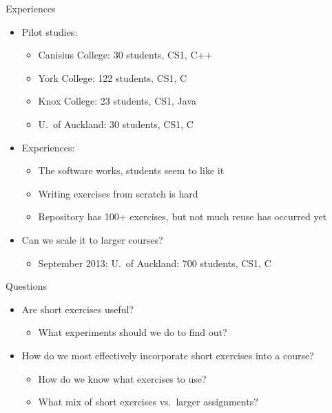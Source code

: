 \documentclass{beamer}
\begin{document}
\begin{frame}{Experiences}

\begin{itemize}
\item Pilot studies:
  \begin{itemize}
  \item Canisius College: 30 students, CS1, C++
  \item York College: 122 students, CS1, C
  \item Knox College: 23 students, CS1, Java
  \item U.\ of Auckland: 30 students, CS1, C
  \end{itemize}
\item Experiences:
  \begin{itemize}
  \item The software works, students seem to like it
  \item Writing exercises from scratch is hard
  \item Repository has 100+ exercises, but not much reuse has occurred yet
  \end{itemize}
\item Can we scale it to larger courses?
  \begin{itemize}
\item September 2013: U.\ of Auckland: 700 students, CS1, C
  \end{itemize}
\end{itemize}

\end{frame}


\begin{frame}{Questions}

\begin{itemize}
\item Are short exercises useful?
  \begin{itemize}
  \item What experiments should we do to find out?
  \end{itemize}
\item How do we most effectively incorporate short exercises into a course?
  \begin{itemize}
  \item How do we know what exercises to use?
  \item What mix of short exercises vs.\ larger assignments?
  \end{itemize}
\end{itemize}

\end{frame}
\end{document}
